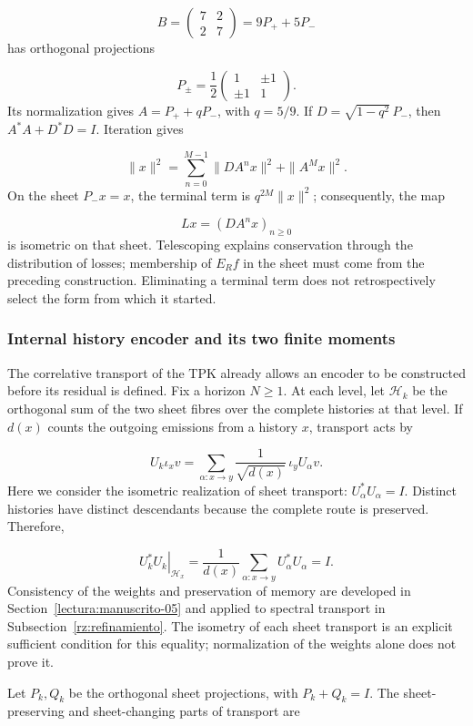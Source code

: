 \[
B=\begin{pmatrix}7&2\\2&7\end{pmatrix}=9P_++5P_-
\]
has orthogonal projections

\[
P_\pm=\frac12
\begin{pmatrix}1&\pm1\\\pm1&1\end{pmatrix}.
\]
Its normalization gives \(A=P_++qP_-\), with \(q=5/9\). If \(D=\sqrt{1-q^2}\,P_-\), then \(A^*A+D^*D=I\). Iteration gives

\[
\|x\|^2=\sum_{n=0}^{M-1}\|DA^nx\|^2+\|A^Mx\|^2.
\]
On the sheet \(P_-x=x\), the terminal term is \(q^{2M}\|x\|^2\); consequently, the map

\[
Lx=(DA^nx)_{n\geq0}
\]
is isometric on that sheet. Telescoping explains conservation through the distribution of losses; membership of \(E_Rf\) in the sheet must come from the preceding construction. Eliminating a terminal term does not retrospectively select the form from which it started.

\subsubsection*{Internal history encoder and its two finite moments}
The correlative transport of the TPK already allows an encoder to be constructed before its residual is defined. Fix a horizon \(N\geq1\). At each level, let \(\mathscr H_k\) be the orthogonal sum of the two sheet fibres over the complete histories at that level. If \(d(x)\) counts the outgoing emissions from a history \(x\), transport acts by

\[
U_k\iota_xv=
\sum_{\alpha:x\to y}\frac1{\sqrt{d(x)}}\,\iota_yU_\alpha v.
\]
Here we consider the isometric realization of sheet transport: \(U_\alpha^*U_\alpha=I\). Distinct histories have distinct descendants because the complete route is preserved. Therefore,

\[
\left.U_k^*U_k\right|_{\mathscr H_x}
=\frac1{d(x)}\sum_{\alpha:x\to y}U_\alpha^*U_\alpha=I.
\]
Consistency of the weights and preservation of memory are developed in Section~\ref{lectura:manuscrito-05} and applied to spectral transport in Subsection~\ref{rz:refinamiento}. The isometry of each sheet transport is an explicit sufficient condition for this equality; normalization of the weights alone does not prove it.

Let \(P_k,Q_k\) be the orthogonal sheet projections, with \(P_k+Q_k=I\). The sheet-preserving and sheet-changing parts of transport are


